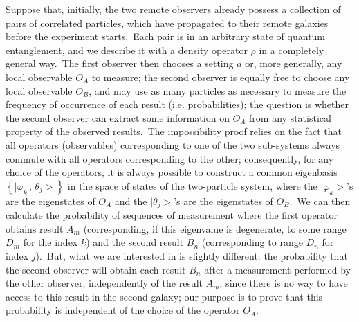 \documentclass[12pt,onecolumn]{article}%
\begin{document}
Suppose that, initially, the two remote observers already possess a collection
of pairs of correlated particles, which have propagated to their remote
galaxies before the experiment starts.\ Each pair is in an arbitrary state of
quantum entanglement, and we describe it with a density operator $\rho$ in a
completely general way.\ The first observer then chooses a setting $a$ or,
more generally, any local observable $O_{A}$ to measure; the second observer
is equally free to choose any local observable $O_{B}$, and may use as many
particles as necessary to measure the frequency of occurrence of each result
(i.e. probabilities); the question is whether the second observer can extract
some information on $O_{A}$ from any statistical property of the observed
results.\ The impossibility proof relies on the fact that all operators
(observables) corresponding to one of the two sub-systems always commute with
all operators corresponding to the other; consequently, for any choice of the
operators, it is always possible to construct a common eigenbasis $\left\{
|\varphi_{k}\,,\,\theta_{j}>\right\}  $ in the space of states of the
two-particle system, where the $|\varphi_{k}>$'s are the eigenstates of
$O_{A}$ and the $|\theta_{j}>$'s are the eigenstates of $O_{B}$.\ We can
then calculate the probability of sequences of measurement where the first
operator obtains result $A_{m}$ (corresponding, if this eigenvalue is
degenerate, to some range $D_{m}$ for the index $k$) and the second result
$B_{n}$ (corresponding to range $D_{n}$ for index $j$).\ But, what we are
interested in is slightly different: the probability that the second observer
will obtain each result $B_{n}$ after a measurement performed by the other
observer, independently of the result $A_{m}$, since there is no way to have
access to this result in the second galaxy; our purpose is to prove that this
probability is independent of the choice of the operator $O_{A}$.
\end{document}
